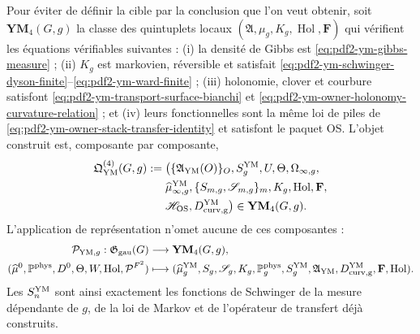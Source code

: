 Pour éviter de définir la cible par la conclusion que l’on veut obtenir, soit
$\mathbf{YM}_4(G,g)$ la classe des quintuplets locaux
$(\mathfrak A,\mu_g,K_g,\operatorname{Hol},\mathbf F)$ qui vérifient les
équations vérifiables suivantes : (i) la densité de Gibbs est
\eqref{eq:pdf2-ym-gibbs-measure} ; (ii) $K_g$ est markovien, réversible et satisfait
\eqref{eq:pdf2-ym-schwinger-dyson-finite}--\eqref{eq:pdf2-ym-ward-finite} ;
(iii) holonomie, clover et courbure satisfont
\eqref{eq:pdf2-ym-transport-surface-bianchi} et
\eqref{eq:pdf2-ym-owner-holonomy-curvature-relation} ; et (iv) leurs fonctionnelles sont la
même loi de piles de \eqref{eq:pdf2-ym-owner-stack-transfer-identity} et satisfont le
paquet OS\@. L’objet construit est, composante par composante,
\begin{equation}\label{eq:pdf2-ym-owner-qym-object}
\begin{aligned}
 \mathfrak Q_{\rm YM}^{(4)}(G,g):={}&
 \bigl(\{\mathfrak A_{\rm YM}(O)\}_O,
 S_g^{\rm YM},U,\Theta,\Omega_{\infty,g},\\
 &\widehat\mu_{\infty,g}^{\rm YM},
 \{S_{m,g},\mathscr S_{m,g}\}_m,K_g,
 \operatorname{Hol},\mathbf F,\\
 &\mathscr H_{\rm OS},D_{\rm curv,g}^{\rm YM}\bigr)
 \in\mathbf{YM}_4(G,g).
\end{aligned}
\end{equation}
L'application de représentation n'omet aucune de ces composantes :
\begin{equation}\label{eq:pdf2-ym-owner-typed-publication-map}
 \begin{aligned}
 \mathcal P_{{\rm YM},g}:\mathfrak G_{\rm gau}(G)&\longrightarrow
 \mathbf{YM}_4(G,g),\\
 (\widehat\mu^0,\mathbb P^{\rm phys},D^0,\Theta,W,
   \operatorname{Hol},\mathcal P^{F^2})
 &\longmapsto
 (\widehat\mu_g^{\rm YM},S_g,\mathscr S_g,K_g,\mathbb P_g^{\rm phys},
  S_g^{\rm YM},\mathfrak A_{\rm YM},D_{\rm curv,g}^{\rm YM},
  \mathbf F,\operatorname{Hol}).
 \end{aligned}
\end{equation}
Les $S_n^{\rm YM}$ sont ainsi exactement les fonctions de Schwinger de la mesure dépendante de $g$, de la loi de Markov et de l'opérateur de transfert déjà construits.

